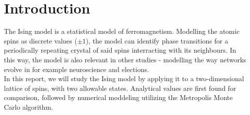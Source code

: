 \documentclass[../main.tex]{subfiles}
\begin{document}
\section{Introduction}
The Ising model is a statistical model of ferromagnetism. Modelling the atomic spins as discrete values ($\pm 1$), the model can identify phase transitions for a periodically repeating crystal of said spins interracting with its neighbours. In this way, the model is also relevant in other studies - modelling the way networks evolve in for example neuroscience and elections. \\
In this report, we will study the Ising model by applying it to a two-dimensional lattice of spins, with two allowable states. Analytical values are first found for comparison, followed by numerical moddeling utilizing the Metropolis Monte Carlo algorithm. 
\end{document}
